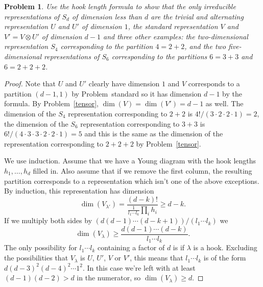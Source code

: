 \documentclass{article}
\newtheorem{problem}{Problem}
\begin{document}
\begin{problem}
Use the hook length formula to show that the only irreducible representations of $S_d$ of dimension less than $d$ are the trivial and alternating representation $U$ and $U'$ of dimension $1$, the standard representation $V$ and $V' = V \otimes U'$ of dimension $d-1$ and three other examples: the two-dimensional representation $S_4$ corresponding to the partition $4 = 2 + 2$, and the two five-dimensional representations of $S_6$ corresponding to the partitions $6 = 3 + 3$ and $6 = 2 + 2 + 2$.
\end{problem}
\begin{proof}
Note that $U$ and $U'$ clearly have dimension $1$ and $V$ corresponds to a partition $(d-1,1)$ by Problem~{standard} so it has dimension $d-1$ by the formula. By Problem~\ref{tensor}, $\dim(V) = \dim(V') = d-1$ as well. The dimension of the $S_4$ representation corresponding to $2 + 2$ is $4!/(3 \cdot 2 \cdot 2 \cdot 1) = 2$, the dimension of the $S_6$ representation corresponding to $3 + 3$ is $6!/(4 \cdot 3 \cdot 3 \cdot 2 \cdot 2 \cdot 1) = 5$ and this is the same as the dimension of the representation corresponding to $2 + 2 + 2$ by Problem~\ref{tensor}.

We use induction. Assume that we have a Young diagram with the hook lengths $h_1, \dots , h_d$ filled in. Also assume that if we remove the first column, the resulting partition corresponds to a representation which isn't one of the above exceptions. By induction, this representation has dimension
\[
\dim (V_{\lambda'}) = \frac{(d-k)!}{\frac{1}{l_1 \cdots l_k} \prod_i h_i} \geq d-k.
\]
If we multiply both sides by $(d(d-1) \cdots (d-k+1))/(l_1 \cdots l_k)$ we
\[
\dim (V_{\lambda}) \geq \frac{d(d-1) \cdots (d-k)}{l_1 \cdots l_k}.
\]
The only possibility for $l_1 \cdots l_k$ containing a factor of $d$ is if $\lambda$ is a hook. Excluding the possibilities that $V_{\lambda}$ is $U$, $U'$, $V$ or $V'$, this means that $l_1 \cdots l_k$ is of the form $d (d-3)^2 (d-4)^2 \cdots 1^2$. In this case we're left with at least $(d-1)(d-2) > d$ in the numerator, so $\dim(V_{\lambda}) \geq d$.
\end{proof}
\end{document}
